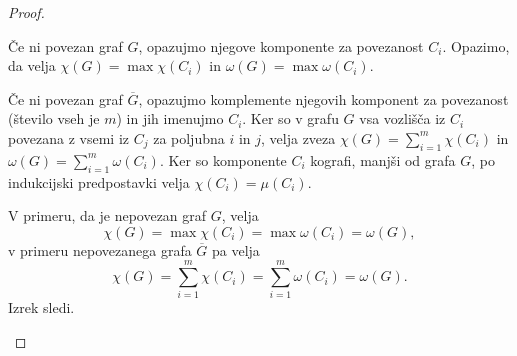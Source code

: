 \documentclass[12pt,a4paper,twoside]{article}
\theoremstyle{definition} %
\theoremstyle{plain} %
\numberwithin{equation}{section}  %
\begin{document}
\begin{proof}
\begin{itemize}
Če ni povezan graf $G$, opazujmo njegove komponente za povezanost $C_i$. Opazimo, da velja $\chi(G) = \max \chi(C_i)$ in $\omega(G) = \max\omega(C_i)$.

Če ni povezan graf $\overline{G}$, opazujmo komplemente njegovih komponent za povezanost (število vseh je $m$) in jih imenujmo $C_i$. Ker so v grafu $G$ vsa vozlišča iz $C_i$ povezana z vsemi iz $C_j$ za poljubna $i$ in $j$, velja zveza $\chi(G) = \sum_{i=1}^m\chi(C_i)$ in $\omega(G) = \sum_{i=1}^m\omega(C_i)$. Ker so komponente $C_i$ kografi, manjši od grafa $G$, po indukcijski predpostavki velja $\chi(C_i) = \mu(C_i)$. 

V primeru, da je nepovezan graf $G$, velja  $$\chi(G) = \max \chi(C_i) =  \max \omega(C_i) = \omega(G),$$
v primeru nepovezanega grafa $\overline{G}$ pa velja $$\chi(G) = \sum_{i=1}^m \chi(C_i) =  \sum_{i=1}^m \omega(C_i) = \omega(G).$$ Izrek sledi. \qedhere
\end{itemize}
\end{proof}
\end{document}

